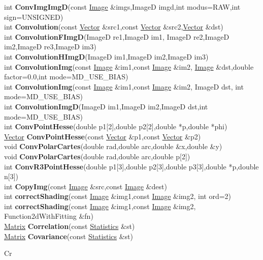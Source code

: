 \documentclass[10pt,titlepage]{article}
\def\functionlistentry#1#2#3#4#5#6{\noindent #1 {\bf #2}(#3) \dotfill #6\\}
\def\letterref#1{}
\def\letterlabel#1{\vspace{0.5cm}\centerline{\Large #1}}
\begin{document}
{{\functionlistentry{int}{ConvImgImgD}{const \hyperlink{Image}{Image} \&imgs,ImageD imgd,int modus=RAW,int sign=UNSIGNED}{86}{Images}{}
\functionlistentry{int}{Convolution}{const \hyperlink{Vector}{Vector} \&src1,const \hyperlink{Vector}{Vector} \&src2,\hyperlink{Vector}{Vector} \&dst}{1211}{signalTrafo}{}
\functionlistentry{int}{ConvolutionFImgD}{ImageD re1,ImageD im1, ImageD re2,ImageD im2,ImageD re3,ImageD im3}{1213}{signalTrafo}{}
\functionlistentry{int}{ConvolutionHImgD}{ImageD im1,ImageD im2,ImageD im3}{1214}{signalTrafo}{}
\functionlistentry{int}{ConvolutionImg}{const \hyperlink{Image}{Image} \&im1,const \hyperlink{Image}{Image} \&im2, \hyperlink{Image}{Image} \&dst,double factor=0.0,int mode=MD\_USE\_BIAS}{1215}{signalTrafo}{}
\functionlistentry{int}{ConvolutionImg}{const \hyperlink{Image}{Image} \&im1,const \hyperlink{Image}{Image} \&im2, ImageD dst, int mode=MD\_USE\_BIAS}{1216}{signalTrafo}{}
\functionlistentry{int}{ConvolutionImgD}{ImageD im1,ImageD im2,ImageD dst,int mode=MD\_USE\_BIAS}{1212}{signalTrafo}{}
\functionlistentry{int}{ConvPointHesse}{double p1[2],double p2[2],double *p,double *phi}{1370}{numeric}{}
\functionlistentry{\hyperlink{Vector}{Vector}}{ConvPointHesse}{const \hyperlink{Vector}{Vector} \&p1,const \hyperlink{Vector}{Vector} \&p2}{1371}{numeric}{}
\functionlistentry{void}{ConvPolarCartes}{double rad,double arc,double \&x,double \&y}{1368}{numeric}{}
\functionlistentry{void}{ConvPolarCartes}{double rad,double arc,double p[2]}{1369}{numeric}{}
\functionlistentry{int}{ConvR3PointHesse}{double p1[3],double p2[3],double p3[3],double *p,double n[3]}{1393}{numeric}{}
\functionlistentry{int}{CopyImg}{const \hyperlink{Image}{Image} \&src,const \hyperlink{Image}{Image} \&dest}{1086}{processing}{}
\functionlistentry{int}{correctShading}{const \hyperlink{Image}{Image} \&img1,const \hyperlink{Image}{Image} \&img2, int ord=2}{1081}{processing}{}
\functionlistentry{int}{correctShading}{const \hyperlink{Image}{Image} \&img1,const \hyperlink{Image}{Image} \&img2, Function2dWithFitting \&fn}{1082}{processing}{}
\functionlistentry{\hyperlink{Matrix}{Matrix}}{Correlation}{const \hyperlink{Statistics}{Statistics} \&st}{871}{statistics}{}
\functionlistentry{\hyperlink{Matrix}{Matrix}}{Covariance}{const \hyperlink{Statistics}{Statistics} \&st}{870}{statistics}{}

\letterlabel{Cr}
\letterref{A}
\letterref{B}
\letterref{C}
\letterref{D}
\letterref{E}
\letterref{F}
\letterref{G}
\letterref{H}
\letterref{I}
\letterref{K}
\letterref{L}
\letterref{M}
\letterref{N}
\letterref{O}
\letterref{P}
\letterref{Q}
\letterref{R}
\letterref{S}
\letterref{T}
\letterref{U}
\letterref{V}
\letterref{W}
\letterref{X}
\letterref{Y}
\letterref{Z}

}}
\end{document}
